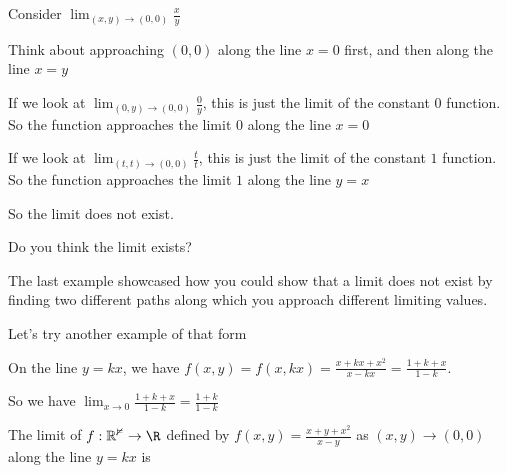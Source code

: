 \documentclass{ximera}
\begin{document}
	\begin{question}
		Consider $\displaystyle\lim_{(x,y) \to (0,0)} \frac{x}{y}$
		\begin{solution}
			\begin{hint}
				Think about approaching $(0,0)$ along the line $x=0$ first, and then along the line $x=y$
			\end{hint}
			\begin{hint}
				If we look at $\displaystyle\lim_{(0,y) \to (0,0)} \frac{0}{y}$, this is just the limit of the constant $0$ function.  So the function approaches the limit $0$ along
				the line $x=0$
			\end{hint}
			\begin{hint}
				If we look at $\displaystyle\lim_{(t,t) \to (0,0)} \frac{t}{t}$, this is just the limit of the constant $1$ function.  So the function approaches the limit $1$ along the 
				line $y=x$
			\end{hint}
			\begin{hint}
				So the limit does not exist.
			\end{hint}
			Do you think the limit exists?
				\begin{multiple-choice}
				\end{multiple-choice}
		\end{solution}
	\end{question}
	
	The last example showcased how you could show that a limit does not exist by finding two different paths along which you approach different limiting values.  
	
	Let's try another example of that form
	
	\begin{question}
		
	\begin{solution}
	\begin{hint}
		On the line $y=kx$, we have $f(x,y) = f(x,kx) = \frac{x+kx+x^2}{x-kx}  = \frac{1+k+x}{1-k }$.
	\end{hint}
	\begin{hint}
		So we have  $\displaystyle\lim_{x \to 0} \frac{1+k+x}{1-k} = \frac{1+k}{1-k}$ 
	\end{hint}
		The limit of $f: \mathbb{R^2} \to \R$ defined by $f(x,y) = \frac{x+y+x^2}{x-y}$ as $(x,y) \to (0,0)$ along the line $y=kx$ is \answer{$(1+k)/(1-k)$}
	\end{solution}		
	\end{question}
	
\end{document}
